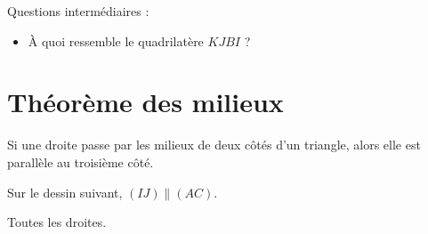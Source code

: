 


Questions intermédiaires : 
\begin{itemize}
    \item  À quoi ressemble le quadrilatère \( KJBI\) ?
\end{itemize}

\section{Théorème des milieux}

\begin{theorem}
    Si une droite passe par les milieux de deux côtés d'un triangle, alors elle est parallèle au troisième côté.
\end{theorem}

Sur le dessin suivant, \( (IJ)\parallel (AC)\).
\begin{center}
   
\end{center}

Toutes les droites.
\begin{center}
   
\end{center}

